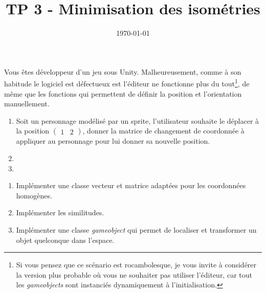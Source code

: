 \documentclass[a4paper,12pt]{article}
\title{TP 3 - Minimisation des isométries}
\author{}
\date{\today}
\begin{document}
\makeonlytitle

\label{exo:theorique}

Vous êtes développeur d'un jeu sous Unity. Malheureusement, comme à son habitude le logiciel est défectueux est l'éditeur ne fonctionne plus du tout\footnote{Si vous pensez que ce scénario est rocambolesque, je vous invite à considérer la version plus probable où vous ne souhaiter pas utiliser l'éditeur, car tout les \textit{gameobjects} sont instanciés dynamiquement à l'initialisation.}, de même que les fonctions qui permettent de définir la position et l'orientation manuellement.  

\begin{enumerate}
  \item Soit un personnage modélisé par un sprite, l'utilisateur souhaite le déplacer à la position $\begin{pmatrix} 1 & 2\end{pmatrix}$, donner la matrice de changement de coordonnée à appliquer au personnage pour lui donner sa nouvelle position.
  \item %
  \item %
\end{enumerate}

\label{exo:impl}


\begin{enumerate}
  \item Implémenter une classe vecteur et matrice adaptées pour les coordonnées homogènes.
  \item Implémenter les similitudes.
  \item Implémenter une classe \textit{gameobject} qui permet de localiser et transformer un objet quelconque dans l'espace.
\end{enumerate}


\end{document}
